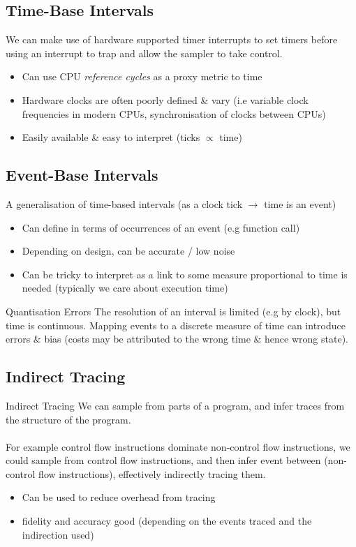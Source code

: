 \subsection{Time-Base Intervals}
We can make use of hardware supported timer interrupts to set timers before using an interrupt to trap and allow the sampler to take control.
\begin{itemize}
    \item Can use CPU \textit{reference cycles} as a proxy metric to time
    \item Hardware clocks are often poorly defined \& vary (i.e variable clock frequencies in modern CPUs, synchronisation of clocks between CPUs)
    \item Easily available \& easy to interpret (ticks $\propto$ time)
\end{itemize}

\subsection{Event-Base Intervals}
A generalisation of time-based intervals (as a clock tick $\to$ time is an event)
\begin{itemize}
    \item Can define in terms of occurrences of an event (e.g function call)
    \item Depending on design, can be accurate / low noise
    \item Can be tricky to interpret as a link to some measure proportional to time is needed (typically we care about execution time)
\end{itemize}

\begin{definitionbox}{Quantisation Errors}
    The resolution of an interval is limited (e.g by clock), but time is continuous. Mapping events to a discrete measure of time can introduce errors \& bias (costs may be attributed to the wrong time \& hence wrong state).
\end{definitionbox}

\subsection{Indirect Tracing}
\begin{definitionbox}{Indirect Tracing}
    We can sample from parts of a program, and infer traces from the structure of the program.
    \\
    \\ For example control flow instructions dominate non-control flow instructions, we could sample from control flow instructions, and then infer event between (non-control flow instructions), effectively indirectly tracing them.
    \begin{itemize}
        \item Can be used to reduce overhead from tracing
        \item fidelity and accuracy good (depending on the events traced and the indirection used)
    \end{itemize}
\end{definitionbox}

